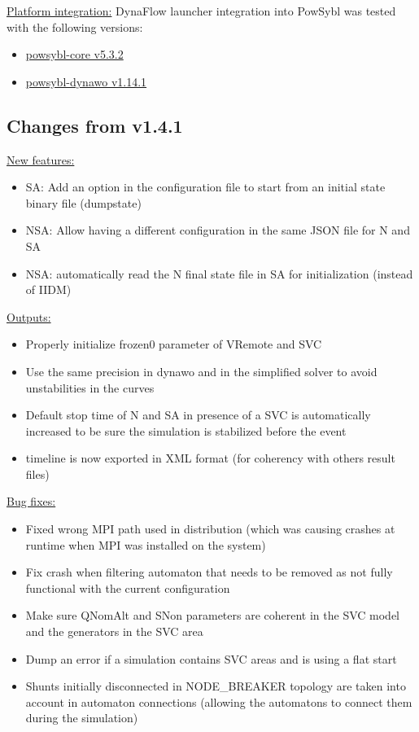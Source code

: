 \documentclass[a4paper, 12pt]{report}
\begin{document}
\underline{Platform integration:}
DynaFlow launcher integration into PowSybl was tested with the following versions:
\begin{itemize}
\item \href{https://github.com/powsybl/powsybl-core/releases/tag/v5.3.2}{powsybl-core v5.3.2}
\item \href{https://github.com/powsybl/powsybl-dynawo/releases/tag/v1.14.1}{powsybl-dynawo v1.14.1}
\end{itemize}

\subsection{Changes from v1.4.1}

\underline{New features:}

\begin{itemize}
\item SA: Add an option in the configuration file to start from an initial state binary file (dumpstate)
\item NSA: Allow having a different configuration in the same JSON file for N and SA
\item NSA: automatically read the N final state file in SA for initialization (instead of IIDM)
\end{itemize}

\underline{Outputs:}

\begin{itemize}
\item Properly initialize frozen0 parameter of VRemote and SVC
\item Use the same precision in dynawo and in the simplified solver to avoid unstabilities in the curves
\item Default stop time of N and SA in presence of a SVC is automatically increased to be sure the simulation is stabilized before the event
\item timeline is now exported in XML format (for coherency with others result files)
\end{itemize}

\underline{Bug fixes:}

\begin{itemize}
\item Fixed wrong MPI path used in distribution (which was causing crashes at runtime when MPI was installed on the system)
\item Fix crash when filtering automaton that needs to be removed as not fully functional with the current configuration
\item Make sure QNomAlt and SNon parameters are coherent in the SVC model and the generators in the SVC area
\item Dump an error if a simulation contains SVC areas and is using a flat start
\item Shunts initially disconnected in NODE_BREAKER topology are taken into account in automaton connections (allowing the automatons to connect them during the simulation)
\end{itemize}
\end{document}
